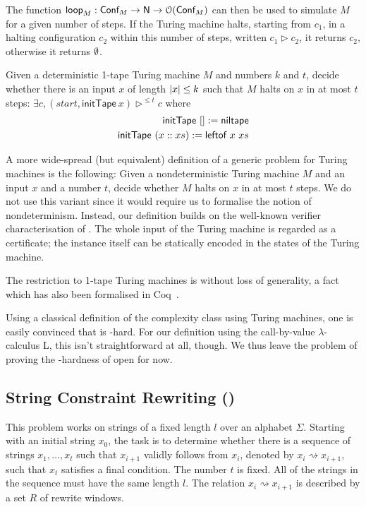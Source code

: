 \documentclass[a4paper,UKenglish,cleveref, autoref]{lipics-v2019}
\newcommand{\strent}{\rightsquigarrow}
\begin{document}
The function $\textsf{loop}_M : \textsf{Conf}_M \rightarrow \mathsf{N} \rightarrow \mathcal{O}{(\textsf{Conf}_M)}$ can then be used to simulate $M$ for a given number of steps. If the Turing machine halts, starting from $c_1$, in a halting configuration $c_2$ within this number of steps, written $c_1 \rhd c_2$, it returns $c_2$, otherwise it returns $\emptyset$.


\begin{definition}[\gennp{}]
  Given a deterministic 1-tape Turing machine $M$ and numbers $k$ and $t$, decide whether there is an input $x$ of length $|x| \le k$ such that $M$ halts on $x$ in at most $t$ steps: 
  $\exists c, (\mathit{start}, \textsf{initTape}~x) \rhd^{\le t} c$
  where 
  \begin{align*}
    \textsf{initTape}~[] := \textsf{niltape}\\
    \textsf{initTape}~(x :: xs) := \textsf{leftof}~x~xs
  \end{align*}
\end{definition}

A more wide-spread (but equivalent) definition of a generic problem for Turing machines is the following: Given a nondeterministic Turing machine $M$ and an input $x$ and a number $t$, decide whether $M$ halts on $x$ in at most $t$ steps. 
We do not use this variant since it would require us to formalise the notion of nondeterminism. Instead, our definition builds on the well-known verifier characterisation of \NP{}. The whole input of the Turing machine is regarded as a certificate; the instance itself can be statically encoded in the states of the Turing machine.

The restriction to 1-tape Turing machines is without loss of generality, a fact which has also been formalised in Coq~\cite{ForsterEtAl:2019:VerifiedTMs}. 

Using a classical definition of the complexity class \NP{} using Turing machines, one is easily convinced that \gennp{} is \NP{}-hard. For our definition using the call-by-value $\lambda$-calculus L, this isn't straightforward at all, though. We thus leave the problem of proving the \NP{}-hardness of \gennp{} open for now.

\subsection{String Constraint Rewriting (\strconrew{})}
This problem works on strings of a fixed length $l$ over an alphabet $\Sigma$. Starting with an initial string $x_0$, the task is to determine whether there is a sequence of strings $x_1, \ldots, x_t$ such that $x_{i+1}$ validly follows from $x_i$, denoted by $x_i \strent x_{i+1}$, such that $x_t$ satisfies a final condition. The number $t$ is fixed. All of the strings in the sequence must have the same length $l$. The relation $x_i \strent x_{i+1}$ is described by a set $R$ of rewrite windows.
\end{document}
